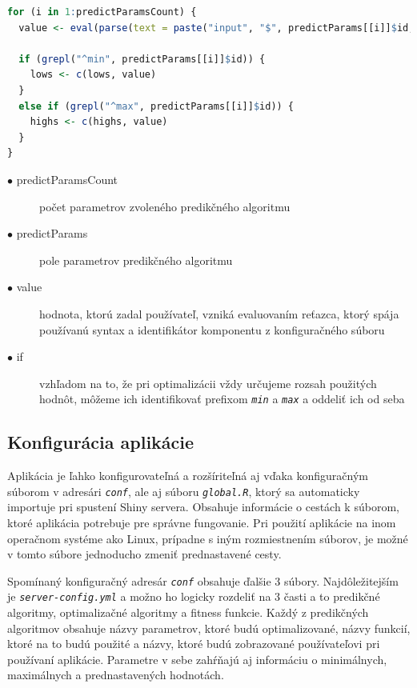 \documentclass[a4paper,slovak,12pt,appendix]{article}
\begin{document}
\begin{lstlisting}[language=R]
for (i in 1:predictParamsCount) {
  value <- eval(parse(text = paste("input", "$", predictParams[[i]]$id, sep = "")))

  if (grepl("^min", predictParams[[i]]$id)) {
    lows <- c(lows, value)
  }
  else if (grepl("^max", predictParams[[i]]$id)) {
    highs <- c(highs, value)
  }
}
\end{lstlisting}

\begin{description}
  \item[$\bullet$ predictParamsCount] počet parametrov zvoleného predikčného algoritmu
  \item[$\bullet$ predictParams] pole parametrov predikčného algoritmu
  \item[$\bullet$ value] hodnota, ktorú zadal používateľ, vzniká evaluovaním reťazca, ktorý spája používanú syntax a identifikátor komponentu z konfiguračného súboru
  \item[$\bullet$ if] vzhľadom na to, že pri optimalizácii vždy určujeme rozsah použitých hodnôt, môžeme ich identifikovať prefixom \texttt{\textit{min}} a \texttt{\textit{max}} a oddeliť ich od seba
\end{description}


\subsection{Konfigurácia aplikácie}
Aplikácia je ľahko konfigurovateľná a rozšíriteľná aj vďaka konfiguračným
súborom v adresári \texttt{\textit{conf}}, ale aj súboru \texttt{\textit{global.R}},
ktorý sa automaticky importuje pri spustení Shiny servera. Obsahuje informácie
o cestách k súborom, ktoré aplikácia potrebuje pre správne fungovanie. Pri
použití aplikácie na inom operačnom systéme ako Linux, prípadne s iným
rozmiestnením súborov, je možné v tomto súbore jednoducho zmeniť prednastavené
cesty.

Spomínaný konfiguračný adresár \texttt{\textit{conf}} obsahuje ďalšie 3 súbory. Najdôležitejším je
\texttt{\textit{server-config.yml}} a možno ho logicky rozdeliť na 3 časti a to predikčné
algoritmy, optimalizačné algoritmy a fitness funkcie. Každý z predikčných
algoritmov obsahuje názvy parametrov, ktoré budú optimalizované, názvy funkcií,
ktoré na to budú použité a názvy, ktoré budú zobrazované používateľovi pri
používaní aplikácie. Parametre v sebe zahŕňajú aj informáciu o minimálnych,
maximálnych a prednastavených hodnotách.
\end{document}
